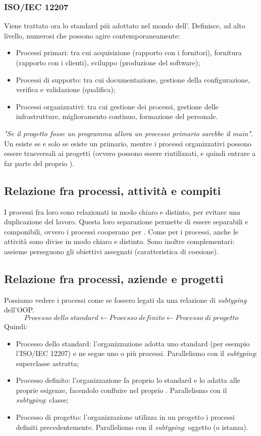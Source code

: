 \documentclass[../main]{subfiles}
\begin{document}
\subsubsection{ISO/IEC 12207}
Viene trattato ora lo standard più adottato nel mondo dell'. Definisce, ad alto livello, numerosi  che possono agire contemporaneamente:
\begin{itemize}
    \item Processi primari: tra cui acquisizione (rapporto con i fornitori), fornitura (rapporto con i clienti), sviluppo (produzione del software);
    \item Processi di supporto: tra cui documentazione, gestione della configurazione, verifica e validazione (qualifica);
    \item Processi organizzativi: tra cui gestione dei processi, gestione delle infrastrutture, miglioramento continuo, formazione del personale.
\end{itemize}
\textit{"Se il progetto fosse un programma allora un processo primario sarebbe il main"}. Un  esiste se e solo se esiste un  primario, mentre i processi organizzativi possono essere trasversali ai progetti (ovvero possono essere riutilizzati, e quindi entrare a far parte del proprio ).
\subsection{Relazione fra processi, attività e compiti}
I processi fra loro sono relazionati in modo chiaro e distinto, per evitare una duplicazione del lavoro. Questa loro separazione permette di essere separabili e componibili, ovvero i processi cooperano per .
Come per i processi, anche le attività sono divise in modo chiaro e distinto. Sono inoltre complementari: assieme perseguono gli obiettivi assegnati (caratteristica di coesione).
\subsection{Relazione fra processi, aziende e progetti}
Possiamo vedere i processi come se fossero legati da una relazione di \textit{subtyping} dell'OOP.
$$Processo\;dello\;standard \leftarrow Processo\;definito \leftarrow Processo\;di\;progetto$$
Quindi:
\begin{itemize}
    \item Processo dello standard: l'organizzazione adotta uno standard (per esempio l'ISO/IEC 12207) e ne segue uno o più processi. Parallelismo con il \textit{subtyping}: superclasse astratta;
    \item Processo definito: l'organizzazione fa proprio lo standard e lo adatta alle proprie esigenze, facendolo confluire nel proprio . Parallelismo con il \textit{subtyping}: classe;
    \item Processo di progetto: l'organizzazione utilizza in un progetto i processi definiti precedentemente. Parallelismo con il \textit{subtyping}: oggetto (o istanza).
\end{itemize}
\end{document}
